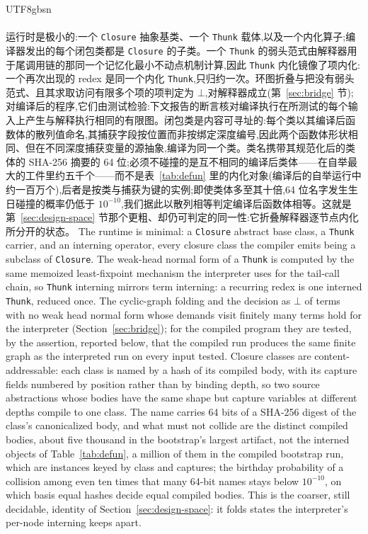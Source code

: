 \begin{CJK*}{UTF8}{gbsn}
  \paragraph{}
  \ifPaperChinese
  运行时是极小的:一个 \texttt{Closure} 抽象基类、一个 \texttt{Thunk} 载体,以及一个内化算子;编译器发出的每个闭包类都是 \texttt{Closure} 的子类。一个 \texttt{Thunk} 的弱头范式由解释器用于尾调用链的那同一个记忆化最小不动点机制计算,因此 \texttt{Thunk} 内化镜像了项内化:一个再次出现的 redex 是同一个内化 \texttt{Thunk},只归约一次。环图折叠与把没有弱头范式、且其求取访问有限多个项的项判定为 $\bot$,对解释器成立(第~\ref{sec:bridge} 节);对编译后的程序,它们由测试检验:下文报告的断言核对编译执行在所测试的每个输入上产生与解释执行相同的有限图。闭包类是内容可寻址的:每个类以其编译后函数体的散列值命名,其捕获字段按位置而非按绑定深度编号,因此两个函数体形状相同、但在不同深度捕获变量的源抽象,编译为同一个类。类名携带其规范化后的类体的 SHA-256 摘要的 64 位;必须不碰撞的是互不相同的编译后类体——在自举最大的工件里约五千个——而不是表~\ref{tab:defun} 里的内化对象(编译后的自举运行中约一百万个),后者是按类与捕获为键的实例;即使类体多至其十倍,64 位名字发生生日碰撞的概率仍低于 $10^{-10}$,我们据此以散列相等判定编译后函数体相等。这就是第~\ref{sec:design-space} 节那个更粗、却仍可判定的同一性:它折叠解释器逐节点内化所分开的状态。
  \else
  The runtime is minimal: a \texttt{Closure} abstract base class, a \texttt{Thunk} carrier, and an interning operator, every closure class the compiler emits being a subclass of \texttt{Closure}. The weak-head normal form of a \texttt{Thunk} is computed by the same memoized least-fixpoint mechanism the interpreter uses for the tail-call chain, so \texttt{Thunk} interning mirrors term interning: a recurring redex is one interned \texttt{Thunk}, reduced once. The cyclic-graph folding and the decision as $\bot$ of terms with no weak head normal form whose demands visit finitely many terms hold for the interpreter (Section~\ref{sec:bridge}); for the compiled program they are tested, by the assertion, reported below, that the compiled run produces the same finite graph as the interpreted run on every input tested. Closure classes are content-addressable: each class is named by a hash of its compiled body, with its capture fields numbered by position rather than by binding depth, so two source abstractions whose bodies have the same shape but capture variables at different depths compile to one class. The name carries 64 bits of a SHA-256 digest of the class's canonicalized body, and what must not collide are the distinct compiled bodies, about five thousand in the bootstrap's largest artifact, not the interned objects of Table~\ref{tab:defun}, a million of them in the compiled bootstrap run, which are instances keyed by class and captures; the birthday probability of a collision among even ten times that many 64-bit names stays below $10^{-10}$, on which basis equal hashes decide equal compiled bodies. This is the coarser, still decidable, identity of Section~\ref{sec:design-space}: it folds states the interpreter's per-node interning keeps apart.
  \fi


\end{CJK*}
